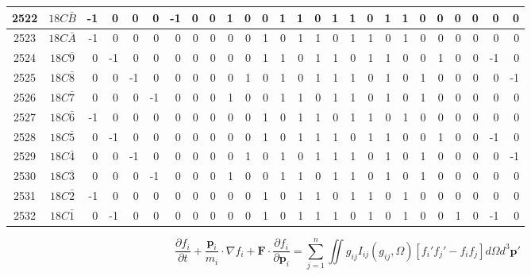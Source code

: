 \documentclass[12 pt]{article}%
\begin{document}
\begin{tiny}
\begin{centering}
\begin{longtable}{|c|c||rrrrrrrrrrrrrrrrrrrrrrrr|}
      \hline
      2522 & $18C\bar B$ & -1 & 0 & 0 & 0 & -1 & 0 & 0 & 1 & 0 & 0 & 1 & 1 & 0 & 1 & 1 & 0 & 1 & 1 & 0 & 0 & 0 & 0 & 0 & 0 \\
      \hline
      2523 & $18C\bar A$ & -1 & 0 & 0 & 0 & 0 & 0 & 0 & 0 & 0 & 1 & 0 & 1 & 1 & 0 & 1 & 1 & 0 & 1 & 0 & 0 & 0 & 0 & 0 & 0 \\
      \hline
      2524 & $18C\bar9$ & 0 & -1 & 0 & 0 & 0 & 0 & 0 & 0 & 0 & 1 & 1 & 0 & 1 & 1 & 0 & 1 & 1 & 0 & 0 & 1 & 0 & 0 & -1 & 0 \\
      \hline
      2525 & $18C\bar8$ & 0 & 0 & -1 & 0 & 0 & 0 & 0 & 0 & 1 & 0 & 1 & 0 & 1 & 1 & 1 & 0 & 1 & 0 & 1 & 0 & 0 & 0 & 0 & -1 \\
      \hline
      2526 & $18C\bar7$ & 0 & 0 & 0 & -1 & 0 & 0 & 0 & 1 & 0 & 0 & 1 & 1 & 0 & 1 & 1 & 0 & 1 & 0 & 1 & 0 & 0 & 0 & 0 & 0 \\
      \hline
      2527 & $18C\bar6$ & -1 & 0 & 0 & 0 & 0 & 0 & 0 & 0 & 0 & 1 & 0 & 1 & 1 & 0 & 1 & 1 & 0 & 1 & 0 & 0 & 0 & 0 & 0 & 0 \\
      \hline
      2528 & $18C\bar5$ & 0 & -1 & 0 & 0 & 0 & 0 & 0 & 0 & 0 & 1 & 0 & 1 & 1 & 1 & 0 & 1 & 1 & 0 & 0 & 1 & 0 & 0 & -1 & 0 \\
      \hline
      2529 & $18C\bar4$ & 0 & 0 & -1 & 0 & 0 & 0 & 0 & 0 & 1 & 0 & 1 & 0 & 1 & 1 & 1 & 0 & 1 & 0 & 1 & 0 & 0 & 0 & 0 & -1 \\
      \hline
      2530 & $18C\bar3$ & 0 & 0 & 0 & -1 & 0 & 0 & 0 & 1 & 0 & 0 & 1 & 1 & 0 & 1 & 1 & 0 & 1 & 0 & 1 & 0 & 0 & 0 & 0 & 0 \\
      \hline
      2531 & $18C\bar2$ & -1 & 0 & 0 & 0 & 0 & 0 & 0 & 0 & 0 & 1 & 0 & 1 & 1 & 0 & 1 & 1 & 0 & 1 & 0 & 0 & 0 & 0 & 0 & 0 \\
      \hline
      2532 & $18C\bar1$ & 0 & -1 & 0 & 0 & 0 & 0 & 0 & 0 & 0 & 1 & 0 & 1 & 1 & 1 & 0 & 1 & 0 & 1 & 0 & 0 & 1 & 0 & -1 & 0 \\
      \hline
    \end{longtable}
  \end{centering}
\end{tiny}

\bigskip
\Large
\begin{equation*}
  \frac{\partial f_{i}}{\partial t} + \frac{\textbf{p}_{i}}{m_{i}} \cdot \nabla f_{i} + \textbf{F} \cdot \frac{\partial f_{i}}{\partial \textbf{p}_{i}} = \sum_{j = 1}^{n} \iint g_{ij}I_{ij}(g_{ij}, \Omega)[f_{i}'f_{j}' - f_{i}f_{j}] d \Omega d^{3} \textbf{p}'
\end{equation*}
\end{document}
